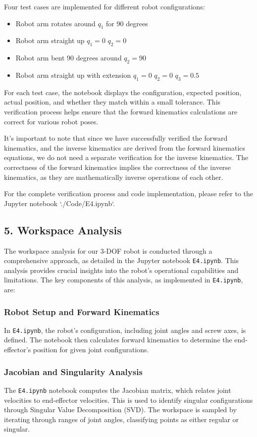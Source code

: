 \begin{solution}
Four test cases are implemented for different robot configurations:
\begin{itemize}
    \item Robot arm rotates around $q_1$ for 90 degrees
    \item Robot arm straight up $q_1=0$ $q_2=0$
    \item Robot arm bent 90 degrees around $q_2=90$
    \item Robot arm straight up with extension  $q_1=0$ $q_2=0$ $q_3=0.5$
\end{itemize}

For each test case, the notebook displays the configuration, expected position, actual position, and whether they match within a small tolerance. This verification process helps ensure that the forward kinematics calculations are correct for various robot poses.

It's important to note that since we have successfully verified the forward kinematics, and the inverse kinematics are derived from the forward kinematics equations, we do not need a separate verification for the inverse kinematics. The correctness of the forward kinematics implies the correctness of the inverse kinematics, as they are mathematically inverse operations of each other.

For the complete verification process and code implementation, please refer to the Jupyter notebook `./Code/E4.ipynb`.	
\subsection*{5. Workspace Analysis}

The workspace analysis for our 3-DOF robot is conducted through a comprehensive approach, as detailed in the Jupyter notebook \texttt{E4.ipynb}. This analysis provides crucial insights into the robot's operational capabilities and limitations. The key components of this analysis, as implemented in \texttt{E4.ipynb}, are:

\subsubsection*{Robot Setup and Forward Kinematics}
In \texttt{E4.ipynb}, the robot's configuration, including joint angles and screw axes, is defined. The notebook then calculates forward kinematics to determine the end-effector's position for given joint configurations.

\subsubsection*{Jacobian and Singularity Analysis}
The \texttt{E4.ipynb} notebook computes the Jacobian matrix, which relates joint velocities to end-effector velocities. This is used to identify singular configurations through Singular Value Decomposition (SVD). The workspace is sampled by iterating through ranges of joint angles, classifying points as either regular or singular.


\end{solution}
